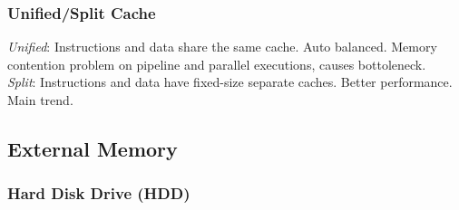 \subsubsection*{Unified/Split Cache}
\emph{Unified}: Instructions and data share the same cache. Auto balanced. Memory contention problem on pipeline and parallel executions, causes bottoleneck.\\
\emph{Split}: Instructions and data have fixed-size separate caches. Better performance. Main trend.

\subsection*{External Memory}

\subsubsection*{Hard Disk Drive (HDD)}